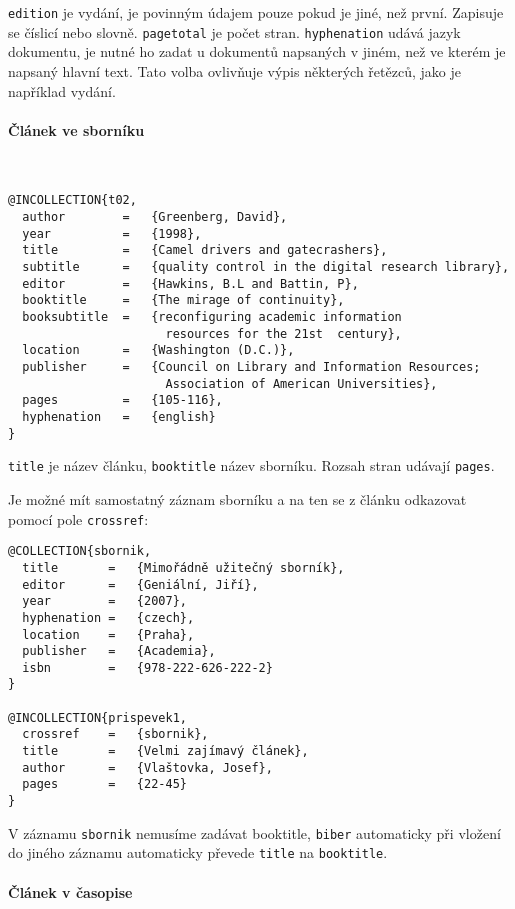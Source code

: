 \documentclass[a4paper,10pt]{ltxdockit}
\def\t|#1|{\texttt{#1}}
\def\c#1{%
\hangpara{3em}{1}%
\fullcite{#1}}
\begin{document}
\t|edition| je vydání, je povinným údajem pouze pokud je jiné, než první. Zapisuje se číslicí nebo slovně. \t|pagetotal| je počet stran. \t|hyphenation| udává jazyk dokumentu, je nutné ho zadat u dokumentů napsaných v jiném, než ve kterém je napsaný hlavní text. Tato volba ovlivňuje výpis některých řetězců, jako je například vydání.

\paragraph{Článek ve sborníku} \hfill\\

\c{t02}
\begin{verbatim}
@INCOLLECTION{t02,
  author        =   {Greenberg, David}, 
  year          =   {1998},
  title         =   {Camel drivers and gatecrashers},
  subtitle      =   {quality control in the digital research library},
  editor        =   {Hawkins, B.L and Battin, P},
  booktitle     =   {The mirage of continuity},
  booksubtitle  =   {reconfiguring academic information 
                      resources for the 21st  century}, 
  location      =   {Washington (D.C.)}, 
  publisher     =   {Council on Library and Information Resources; 
                      Association of American Universities}, 
  pages         =   {105-116},
  hyphenation   =   {english}
}
\end{verbatim} 
 \t|title| je název článku, \t|booktitle| název sborníku. Rozsah stran udávají \t|pages|.
 
 Je možné mít samostatný záznam sborníku a na ten se z článku odkazovat pomocí pole \t|crossref|:
 
\noindent\c{prispevek1}
 
 \begin{verbatim}
@COLLECTION{sbornik,
  title       =   {Mimořádně užitečný sborník},
  editor      =   {Geniální, Jiří},
  year        =   {2007},
  hyphenation =   {czech},
  location    =   {Praha},
  publisher   =   {Academia},
  isbn        =   {978-222-626-222-2}
}

@INCOLLECTION{prispevek1,
  crossref    =   {sbornik},
  title       =   {Velmi zajímavý článek},
  author      =   {Vlaštovka, Josef},
  pages       =   {22-45}
}
 \end{verbatim}
 
 V záznamu \t|sbornik| nemusíme zadávat booktitle, \t|biber| automaticky při vložení do jiného záznamu automaticky převede \t|title| na \t|booktitle|. 
 
 \paragraph{Článek v časopise}\hfill\\
 
\end{document}
